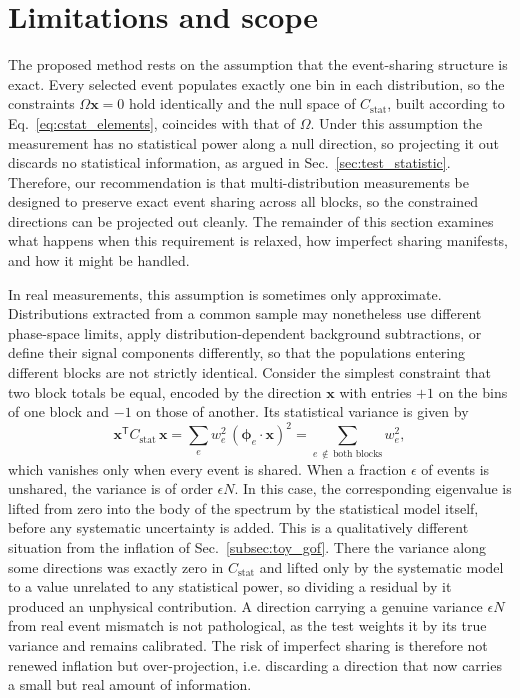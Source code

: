 \documentclass[a4paper,11pt]{article}
\begin{document}
\section{Limitations and scope}
\label{sec:limitations}

The proposed method rests on the assumption that the event-sharing structure is exact. Every selected event populates exactly one bin in each distribution, so the constraints $\Omega \mathbf{x} = 0$ hold identically and the null space of $C_{\text{stat}}$, built according to Eq.~\eqref{eq:cstat_elements}, coincides with that of $\Omega$. Under this assumption the measurement has no statistical power along a null direction, so projecting it out discards no statistical information, as argued in Sec.~\ref{sec:test_statistic}. Therefore, our recommendation is that multi-distribution measurements be designed to preserve exact event sharing across all blocks, so the constrained directions can be projected out cleanly. The remainder of this section examines what happens when this requirement is relaxed, how imperfect sharing manifests, and how it might be handled.

In real measurements, this assumption is sometimes only approximate. Distributions extracted from a common sample may nonetheless use different phase-space limits, apply distribution-dependent background subtractions, or define their signal components differently, so that the populations entering different blocks are not strictly identical. Consider the simplest constraint that two block totals be equal, encoded by the direction $\mathbf{x}$ with entries $+1$ on the bins of one block and $-1$ on those of another. Its statistical variance is given by
\begin{equation}
    \mathbf{x}^{\mathsf{T}} C_{\text{stat}}\, \mathbf{x} = \sum_{e} w_e^2\,(\boldsymbol{\phi}_e \cdot \mathbf{x})^2 = \sum_{e\,\notin\,\text{both blocks}} w_e^2,
\end{equation}
which vanishes only when every event is shared. When a fraction $\epsilon$ of events is unshared, the variance is of order $\epsilon N$. In this case, the corresponding eigenvalue is lifted from zero into the body of the spectrum by the statistical model itself, before any systematic uncertainty is added. This is a qualitatively different situation from the inflation of Sec.~\ref{subsec:toy_gof}. There the variance along some directions was exactly zero in $C_{\text{stat}}$ and lifted only by the systematic model to a value unrelated to any statistical power, so dividing a residual by it produced an unphysical contribution. A direction carrying a genuine variance $\epsilon N$ from real event mismatch is not pathological, as the test weights it by its true variance and remains calibrated. The risk of imperfect sharing is therefore not renewed inflation but over-projection, i.e. discarding a direction that now carries a small but real amount of information.
\end{document}
